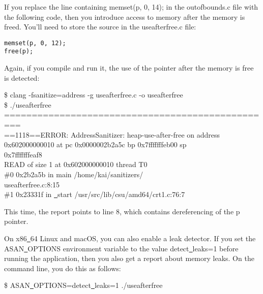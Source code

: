 If you replace the line containing memset(p, 0, 14); in the outofbounds.c file with the following code, then you introduce access to memory after the memory is freed. You'll need to store the source in the useafterfree.c file:\par

\begin{lstlisting}[caption={}]
memset(p, 0, 12);
free(p);
\end{lstlisting}

Again, if you compile and run it, the use of the pointer after the memory is free is detected:\par

\begin{tcolorbox}[colback=white,colframe=black]
\$ clang -fsanitize=address -g useafterfree.c -o useafterfree \\
\$ ./useafterfree \\
============================================== \\
=== \\
==1118==ERROR: AddressSanitizer: heap-use-after-free on address \\
0x602000000010 at pc 0x0000002b2a5c bp 0x7fffffffeb00 sp \\
0x7fffffffeaf8 \\
READ of size 1 at 0x602000000010 thread T0 \\
\hspace*{1cm}\#0 0x2b2a5b in main /home/kai/sanitizers/ \\
useafterfree.c:8:15 \\
\hspace*{1cm}\#1 0x23331f in \underline{~}start  /usr/src/lib/csu/amd64/crt1.c:76:7
\end{tcolorbox}

This time, the report points to line 8, which contains dereferencing of the p pointer.\par

On x86\underline{~}64 Linux and macOS, you can also enable a leak detector. If you set the ASAN\underline{~}OPTIONS environment variable to the value detect\underline{~}leaks=1 before running the application, then you also get a report about memory leaks. On the command line, you do this as follows:\par

\begin{tcolorbox}[colback=white,colframe=black]
\$ ASAN\underline{~}OPTIONS=detect\underline{~}leaks=1 ./useafterfree
\end{tcolorbox}

